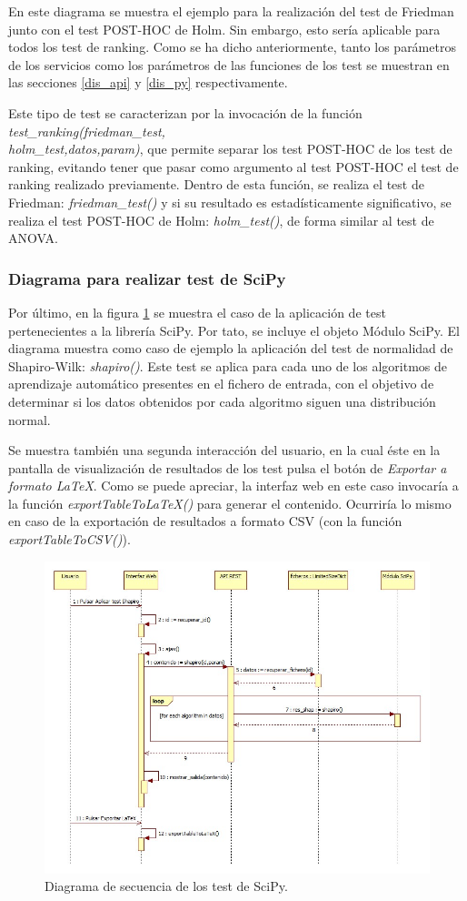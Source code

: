 En este diagrama se muestra el ejemplo para la realización del test de Friedman junto con el test POST-HOC de Holm. Sin embargo, esto sería aplicable para todos los test de ranking. Como se ha dicho anteriormente, tanto los parámetros de los servicios como los parámetros de las funciones de los test se muestran en las secciones \ref{dis_api} y \ref{dis_py} respectivamente.

Este tipo de test se caracterizan por la invocación de la función \textit{test\_ranking(friedman\_test,\\holm\_test,datos,param)}, que permite separar los test POST-HOC de los test de ranking, evitando tener que pasar como argumento al test POST-HOC el test de ranking realizado previamente. Dentro de esta función, se realiza el test de Friedman: \textit{friedman\_test()} y si su resultado es estadísticamente significativo, se realiza el test POST-HOC de Holm: \textit{holm\_test()}, de forma similar al test de ANOVA.

\subsubsection{Diagrama para realizar test de SciPy}

Por último, en la figura \ref{fig:sec_scipy} se muestra el caso de la aplicación de test pertenecientes a la librería SciPy. Por tato, se incluye el objeto Módulo SciPy. El diagrama muestra como caso de ejemplo la aplicación del test de normalidad de Shapiro-Wilk: \textit{shapiro()}. Este test se aplica para cada uno de los algoritmos de aprendizaje automático presentes en el fichero de entrada, con el objetivo de determinar si los datos obtenidos por cada algoritmo siguen una distribución normal.

Se muestra también una segunda interacción del usuario, en la cual éste en la pantalla de visualización de resultados de los test pulsa el botón de \textit{Exportar a formato \LaTeX}. Como se puede apreciar, la interfaz web en este caso invocaría  a la función \textit{exportTableToLaTeX()} para generar el contenido. Ocurriría lo mismo en caso de la exportación de resultados a formato CSV (con la función \textit{exportTableToCSV()}).

\begin{figure}[H]
\centering
\includegraphics[scale=0.5]{figuras/sec_scipy.jpg}
\caption{Diagrama de secuencia de los test de SciPy.}
\label{fig:sec_scipy}
\end{figure}
